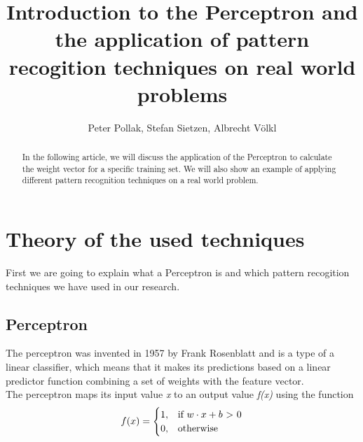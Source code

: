 \documentclass{article}
\begin{document}
\title{Introduction to the Perceptron and the application of pattern recogition techniques on real world problems}
\author{Peter Pollak, Stefan Sietzen, Albrecht V\"olkl}

\maketitle

\begin{abstract}
In the following article, we will discuss the application of the Perceptron to calculate the weight vector for a specific training set. We will also show an example of applying different pattern recognition techniques on a real world problem.
\end{abstract}


\section{Theory of the used techniques}

First we are going to explain what a Perceptron is and which pattern recogition techniques we have used in our research.

\subsection{Perceptron}

The perceptron was invented in 1957 by Frank Rosenblatt and is a type of a linear classifier, which means that it makes its predictions based on a linear predictor function combining a set of weights with the feature vector. 
\\The perceptron maps its input value \emph{x} to an output value \emph{f(x)} using the function
\\


\begin{equation}
f(x) = \begin{cases} 
    1, & \mbox{if } w \cdot x+b \mbox{ \textgreater \ 0} 
    \\ 
    0, & \mbox{otherwise }
\end{cases}
\end{equation}
\\
\end{document}

